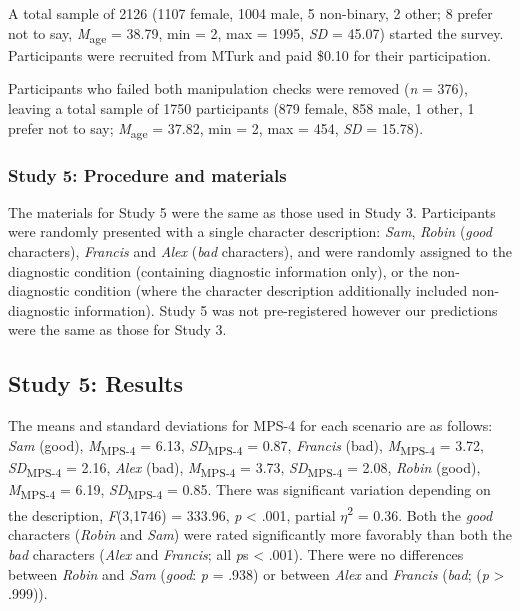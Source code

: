 \documentclass[
  english,
  man,floatsintext]{apa7}
\begin{document}
A total sample of 2126 (1107 female, 1004 male, 5 non-binary, 2 other; 8 prefer not to say, \emph{M}\textsubscript{age} = 38.79, min = 2, max = 1995, \emph{SD} = 45.07) started the survey. Participants were recruited from MTurk and paid \$0.10 for their participation.

Participants who failed both manipulation checks were removed (\emph{n} = 376), leaving a total sample of 1750 participants (879 female, 858 male, 1 other, 1 prefer not to say; \emph{M}\textsubscript{age} = 37.82, min = 2, max = 454, \emph{SD} = 15.78).

\hypertarget{study-5-procedure-and-materials}{%
\subsubsection{Study 5: Procedure and materials}\label{study-5-procedure-and-materials}}

The materials for Study 5 were the same as those used in Study 3. Participants were randomly presented with a single character description: \emph{Sam}, \emph{Robin} (\emph{good} characters), \emph{Francis} and \emph{Alex} (\emph{bad} characters), and were randomly assigned to the diagnostic condition (containing diagnostic information only), or the non-diagnostic condition (where the character description additionally included non-diagnostic information). Study 5 was not pre-registered however our predictions were the same as those for Study 3.

\hypertarget{study-5-results}{%
\subsection{Study 5: Results}\label{study-5-results}}

The means and standard deviations for MPS-4 for each scenario are as follows:
\emph{Sam} (good),
\emph{M}\textsubscript{MPS-4} = 6.13, \emph{SD}\textsubscript{MPS-4} = 0.87,
\emph{Francis} (bad),
\emph{M}\textsubscript{MPS-4} = 3.72, \emph{SD}\textsubscript{MPS-4} = 2.16,
\emph{Alex} (bad),
\emph{M}\textsubscript{MPS-4} = 3.73, \emph{SD}\textsubscript{MPS-4} = 2.08,
\emph{Robin} (good),
\emph{M}\textsubscript{MPS-4} = 6.19, \emph{SD}\textsubscript{MPS-4} = 0.85. There was significant variation depending on the description, \emph{F}(3,1746) = 333.96, \emph{p} \textless{} .001, partial \(\eta\)\textsuperscript{2} = 0.36. Both the \emph{good} characters (\emph{Robin} and \emph{Sam}) were rated significantly more favorably than both the \emph{bad} characters (\emph{Alex} and \emph{Francis}; all \emph{p}s \textless{} .001). There were no differences between \emph{Robin} and \emph{Sam} (\emph{good}: \emph{p} = .938) or between \emph{Alex} and \emph{Francis} (\emph{bad}; (\emph{p} \textgreater{} .999)).
\end{document}
